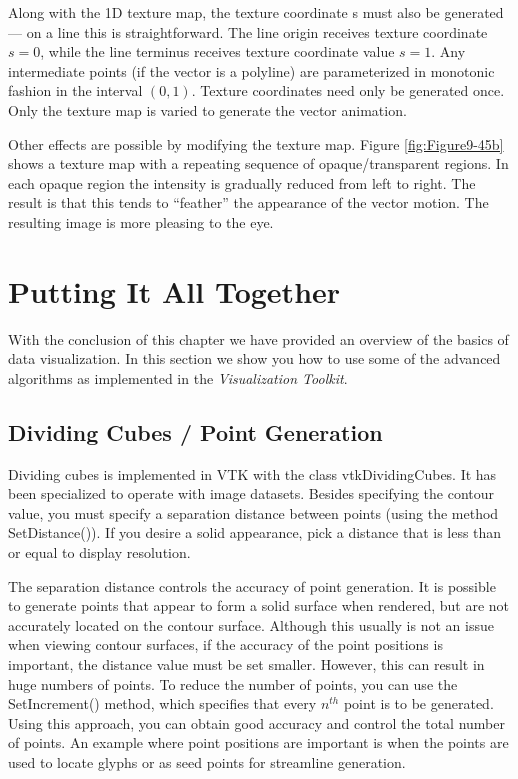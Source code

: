 Along with the 1D texture map, the texture coordinate s must also be generated --- on a line this is straightforward. The line origin receives texture coordinate $s = 0$, while the line terminus receives texture coordinate value $s = 1$. Any intermediate points (if the vector is a polyline) are parameterized in monotonic fashion in the interval $(0,1)$. Texture coordinates need only be generated once. Only the texture map is varied to generate the vector animation.

Other effects are possible by modifying the texture map. Figure \ref{fig:Figure9-45b} shows a texture map with a repeating sequence of opaque/transparent regions. In each opaque region the intensity is gradually reduced from left to right. The result is that this tends to ``feather'' the appearance of the vector motion. The resulting image is more pleasing to the eye.

\section{Putting It All Together}

With the conclusion of this chapter we have provided an overview of the basics of data visualization. In this section we show you how to use some of the advanced algorithms as implemented in the \emph{Visualization Toolkit}.

\subsection{Dividing Cubes / Point Generation}

Dividing cubes is implemented in VTK with the class vtkDividingCubes. It has been specialized to operate with image datasets. Besides specifying the contour value, you must specify a separation distance between points (using the method SetDistance()). If you desire a solid appearance, pick a distance that is less than or equal to display resolution.

The separation distance controls the accuracy of point generation. It is possible to generate points that appear to form a solid surface when rendered, but are not accurately located on the contour surface. Although this usually is not an issue when viewing contour surfaces, if the accuracy of the point positions is important, the distance value must be set smaller. However, this can result in huge numbers of points. To reduce the number of points, you can use the SetIncrement() method, which specifies that every $n^{th}$ point is to be generated. Using this approach, you can obtain good accuracy and control the total number of points. An example where point positions are important is when the points are used to locate glyphs or as seed points for streamline generation.

